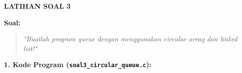 \documentclass[11pt,a4paper]{article}
\begin{document}
\newpage

\begin{center}
    {\Large\textbf{LATIHAN SOAL 3}}
\end{center}

\vspace{0.2cm}
\noindent\textbf{Soal:}
\begin{quote}
    \textit{"Buatlah program queue dengan menggunakan circular array dan linked list!"}
\end{quote}

\vspace{0.4cm}

\vspace{0.2cm}
\noindent\textbf{1. Kode Program (\texttt{soal3\_circular\_queue.c}):}
\end{document}
